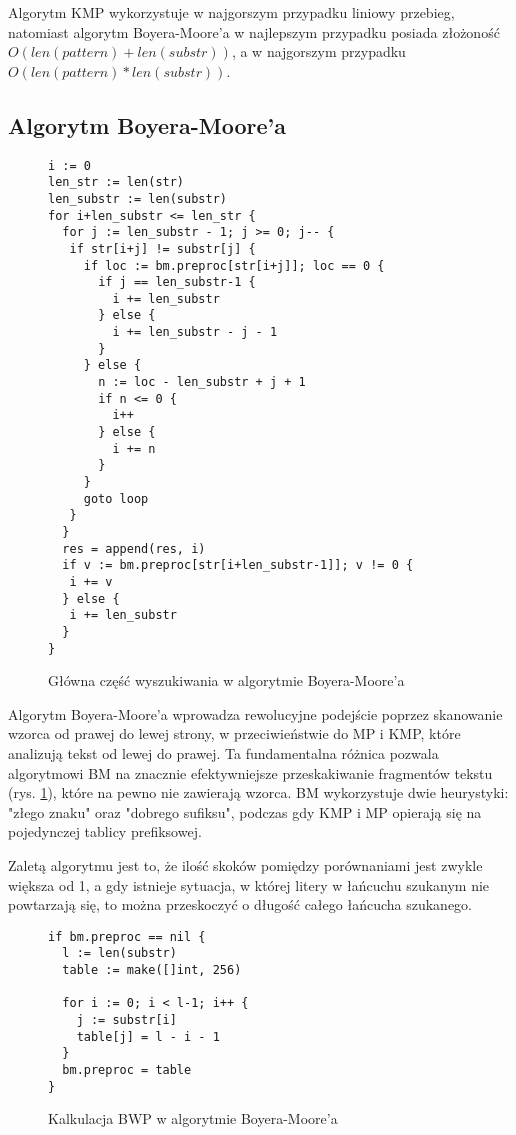 Algorytm KMP wykorzystuje w najgorszym przypadku liniowy przebieg, natomiast
algorytm Boyera-Moore'a w najlepszym przypadku posiada złożoność $O({len(pattern)}+{len(substr)})$, a w 
najgorszym przypadku $O({len(pattern)}*{len(substr)})$.

\subsection{Algorytm Boyera-Moore'a}
\label{sch:algoBoyerMoore}

\begin{figure}[htbp]
    \centering
    \begin{lstlisting}
i := 0
len_str := len(str)
len_substr := len(substr)
for i+len_substr <= len_str {
  for j := len_substr - 1; j >= 0; j-- {
   if str[i+j] != substr[j] {
     if loc := bm.preproc[str[i+j]]; loc == 0 {
       if j == len_substr-1 {
         i += len_substr
       } else {
         i += len_substr - j - 1
       }
     } else {
       n := loc - len_substr + j + 1
       if n <= 0 {
         i++
       } else {
         i += n
       }
     }
     goto loop
   }
  }
  res = append(res, i)
  if v := bm.preproc[str[i+len_substr-1]]; v != 0 {
   i += v
  } else {
   i += len_substr
  }
}
    \end{lstlisting}
    \caption{Główna część wyszukiwania w algorytmie Boyera-Moore'a}
    \label{fig:code:BMmain}
\end{figure}

Algorytm Boyera-Moore'a wprowadza rewolucyjne podejście poprzez skanowanie 
wzorca od prawej do lewej strony, w przeciwieństwie do MP i KMP, które 
analizują tekst od lewej do prawej. Ta fundamentalna różnica pozwala algorytmowi BM na 
znacznie efektywniejsze przeskakiwanie fragmentów tekstu (rys. \ref{fig:code:BMmain}), które na pewno nie 
zawierają wzorca. BM wykorzystuje dwie heurystyki: "złego znaku" oraz "dobrego
sufiksu", podczas gdy KMP i MP opierają się na pojedynczej tablicy prefiksowej.

Zaletą algorytmu jest to, że ilość skoków pomiędzy porównaniami jest zwykle 
większa od 1, a gdy istnieje sytuacja, w której litery w łańcuchu szukanym nie
powtarzają się, to można przeskoczyć o długość całego łańcucha szukanego.

\begin{figure}[htbp]
    \centering
    \begin{lstlisting}
if bm.preproc == nil {
  l := len(substr)
  table := make([]int, 256)

  for i := 0; i < l-1; i++ {
    j := substr[i]
    table[j] = l - i - 1
  }
  bm.preproc = table
}
    \end{lstlisting}
    \caption{Kalkulacja BWP w algorytmie Boyera-Moore'a}
    \label{fig:code:BMpreproc}
\end{figure}


